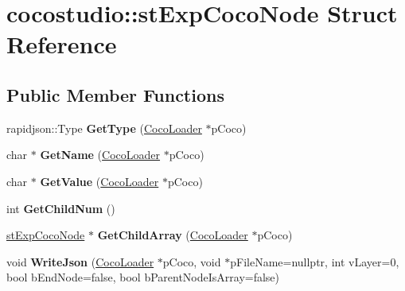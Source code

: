 \hypertarget{structcocostudio_1_1stExpCocoNode}{}\section{cocostudio\+:\+:st\+Exp\+Coco\+Node Struct Reference}
\label{structcocostudio_1_1stExpCocoNode}
\subsection*{Public Member Functions}
\begin{DoxyCompactItemize}
\item 
\mbox{\label{structcocostudio_1_1stExpCocoNode_a6aed005237e9b661de18be34bb3668c4}} 
rapidjson\+::\+Type {\bfseries Get\+Type} (\hyperlink{classcocostudio_1_1CocoLoader}{Coco\+Loader} $\ast$p\+Coco)
\item 
\mbox{\label{structcocostudio_1_1stExpCocoNode_a27d7658cbe1023082f8f0f3f840ff81b}} 
char $\ast$ {\bfseries Get\+Name} (\hyperlink{classcocostudio_1_1CocoLoader}{Coco\+Loader} $\ast$p\+Coco)
\item 
\mbox{\label{structcocostudio_1_1stExpCocoNode_abf7e081b994fb2a753ac8a9373b45076}} 
char $\ast$ {\bfseries Get\+Value} (\hyperlink{classcocostudio_1_1CocoLoader}{Coco\+Loader} $\ast$p\+Coco)
\item 
\mbox{\label{structcocostudio_1_1stExpCocoNode_a0337623bc8e1679b04f1a206018ae9af}} 
int {\bfseries Get\+Child\+Num} ()
\item 
\mbox{\label{structcocostudio_1_1stExpCocoNode_ad0b842e3248b584c3a29794c2476fdd2}} 
\hyperlink{structcocostudio_1_1stExpCocoNode}{st\+Exp\+Coco\+Node} $\ast$ {\bfseries Get\+Child\+Array} (\hyperlink{classcocostudio_1_1CocoLoader}{Coco\+Loader} $\ast$p\+Coco)
\item 
\mbox{\label{structcocostudio_1_1stExpCocoNode_ab970af470e5689808955f3392a34cbe7}} 
void {\bfseries Write\+Json} (\hyperlink{classcocostudio_1_1CocoLoader}{Coco\+Loader} $\ast$p\+Coco, void $\ast$p\+File\+Name=nullptr, int v\+Layer=0, bool b\+End\+Node=false, bool b\+Parent\+Node\+Is\+Array=false)

\end{DoxyCompactItemize}
